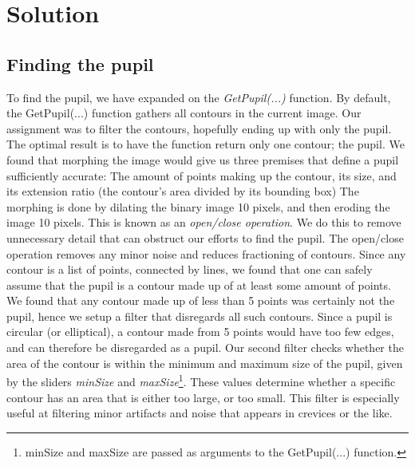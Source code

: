 \section{Solution}

\subsection{Finding the pupil}
To find the pupil, we have expanded on the \emph{GetPupil(...)} function.\newline
By default, the GetPupil(...) function gathers all contours in the current image. Our assignment was to filter the contours, hopefully ending up with only the pupil.\newline
\newline
The optimal result is to have the function return only one contour; the pupil. We found that morphing the image would give us three premises that define a pupil sufficiently accurate: The amount of points making up the contour, its size, and its extension ratio (the contour's area divided by its bounding box)\newline
\newline
The morphing is done by dilating the binary image 10 pixels, and then eroding the image 10 pixels. This is known as an \emph{open/close operation}. We do this to remove unnecessary detail that can obstruct our efforts to find the pupil. The open/close operation removes any minor noise and reduces fractioning of contours.\newline
\newline
Since any contour is a list of points, connected by lines, we found that one can safely assume that the pupil is a contour made up of at least some amount of points. We found that any contour made up of less than 5 points was certainly not the pupil, hence we setup a filter that disregards all such contours. Since a pupil is circular (or elliptical), a contour made from 5 points would have too few edges, and can therefore be disregarded as a pupil.\newline
\newline
Our second filter checks whether the area of the contour is within the minimum and maximum size of the pupil, given by the sliders \emph{minSize} and \emph{maxSize}\footnote{minSize and maxSize are passed as arguments to the GetPupil(...) function.}. These values determine whether a specific contour has an area that is either too large, or too small. This filter is especially useful at filtering minor artifacts and noise that appears in crevices or the like.\newline
